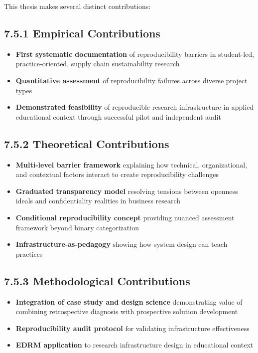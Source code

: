 \documentclass[
  oneside,
  open=any]{scrbook}
\providecommand{\tightlist}{%
  \setlength{\itemsep}{0pt}\setlength{\parskip}{0pt}}\usepackage{longtable,booktabs,array}
\begin{document}
This thesis makes several distinct contributions:

\subsection{7.5.1 Empirical
Contributions}\label{empirical-contributions}

\begin{itemize}
\tightlist
\item
  \textbf{First systematic documentation} of reproducibility barriers in
  student-led, practice-oriented, supply chain sustainability research
\item
  \textbf{Quantitative assessment} of reproducibility failures across
  diverse project types
\item
  \textbf{Demonstrated feasibility} of reproducible research
  infrastructure in applied educational context through successful pilot
  and independent audit
\end{itemize}

\subsection{7.5.2 Theoretical
Contributions}\label{theoretical-contributions-1}

\begin{itemize}
\tightlist
\item
  \textbf{Multi-level barrier framework} explaining how technical,
  organizational, and contextual factors interact to create
  reproducibility challenges
\item
  \textbf{Graduated transparency model} resolving tensions between
  openness ideals and confidentiality realities in business research
\item
  \textbf{Conditional reproducibility concept} providing nuanced
  assessment framework beyond binary categorization
\item
  \textbf{Infrastructure-as-pedagogy} showing how system design can
  teach practices
\end{itemize}

\subsection{7.5.3 Methodological
Contributions}\label{methodological-contributions}

\begin{itemize}
\tightlist
\item
  \textbf{Integration of case study and design science} demonstrating
  value of combining retrospective diagnosis with prospective solution
  development
\item
  \textbf{Reproducibility audit protocol} for validating infrastructure
  effectiveness
\item
  \textbf{EDRM application} to research infrastructure design in
  educational context
\end{itemize}
\end{document}

